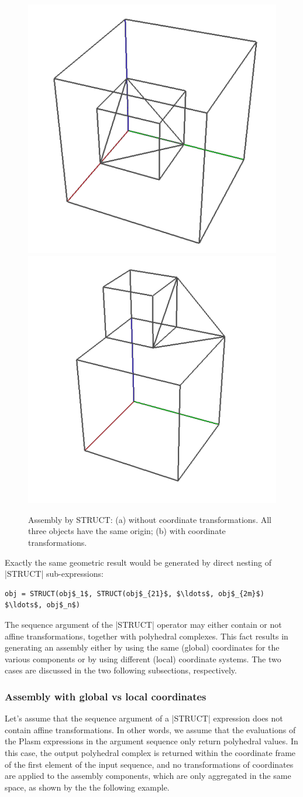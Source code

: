 \begin{coding}
\begin{figure}[htbp] %
   \centering
   \includegraphics[width=0.3\linewidth]{chapter-04/figs/global} 
   \includegraphics[width=0.3\linewidth]{chapter-04/figs/local} 
   \caption{Assembly by STRUCT: (a) without coordinate transformations. All three objects have the same origin;
    (b) with coordinate transformations.}
   \label{fig:4:struct1}
\end{figure}

Exactly the same geometric result would be generated by direct nesting of |STRUCT|
sub-expressions:
\begin{lstlisting}[language=JuliaLocal, style=julia, mathescape=true]
obj = STRUCT(obj$_1$, STRUCT(obj$_{21}$, $\ldots$, obj$_{2m}$) $\ldots$, obj$_n$)
\end{lstlisting}


The sequence argument of the |STRUCT| operator may either
contain or not affine transformations, together with polyhedral
complexes.  This fact results in generating an assembly either by
using the same (global) coordinates for the various components or by
using different (local) coordinate systems.  The two cases are
discussed in the two following subsections, respectively.

\subsubsection*{Assembly with global vs local coordinates}

Let’s assume that the sequence argument of a |STRUCT| expression
does not contain affine transformations. In other words, we assume
that the evaluations of the Plasm expressions in the argument sequence
only return polyhedral values.
In this case, the output polyhedral complex is returned within the
coordinate frame of the first element of the input sequence, and no
transformations of coordinates are applied to the assembly components,
which are only aggregated in the same space, as shown by the
the following example.


\end{coding}
